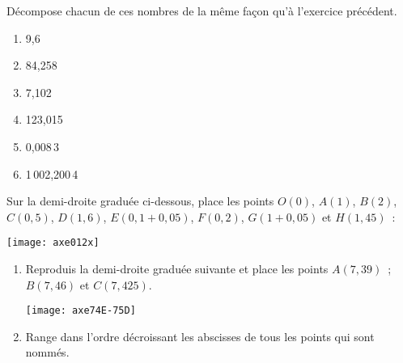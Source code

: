 \begin{exercice}
Décompose chacun de ces nombres de la même façon qu'à l'exercice précédent.
\begin{enumerate} 
 \item 9,6 \dotfill \hspace*{13em}
 
 \item 84,258 \dotfill \hspace*{13em}
 
 \item 7,102 \dotfill \hspace*{13em}
 
 \item 123,015 \dotfill \hspace*{13em}
 
 \item 0,008\,3 \dotfill \hspace*{13em}
 
 \item 1\,002,200\,4 \dotfill \hspace*{13em}
 
 \end{enumerate}
\end{exercice}


\begin{exercice}
Sur la demi-droite graduée ci-dessous, place les points $O(0)$, $A(1)$, $B(2)$, $C(0,5)$, $D(1,6)$, $E(0,1 + 0,05)$, $F(0,2)$, $G(1 + 0,05)$ et $H(1,45)$ :
\begin{center} \texttt{[image: axe012x]} \end{center}
\end{exercice}



\begin{exercice}
\begin{enumerate}
 \item Reproduis la demi-droite graduée suivante et place les points $A(7,39)$ ; $B(7,46)$ et $C(7,425)$.
\begin{center} \texttt{[image: axe74E-75D]} \end{center}
 \item Range dans l'ordre décroissant les abscisses de tous les points qui sont nommés.
 \end{enumerate}
\end{exercice}


